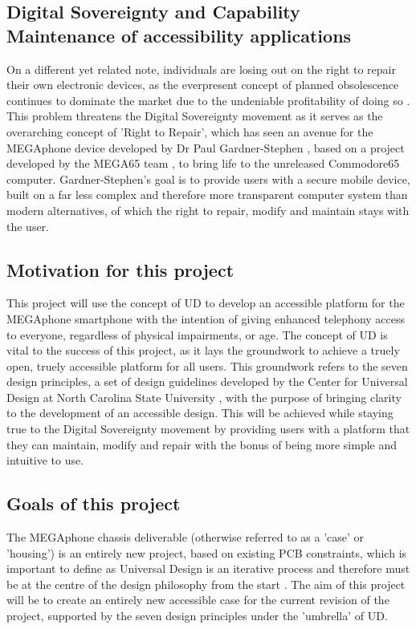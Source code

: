 \subsection{Digital Sovereignty and Capability Maintenance of accessibility applications} %
On a different yet related note, individuals are losing out on the right to repair their own electronic devices, as the everpresent concept of planned obsolescence continues to dominate the market due to the undeniable profitability of doing so \cite{obsolescence2}.
This problem threatens the Digital Sovereignty movement as it serves as the overarching concept of 'Right to Repair', which has seen an avenue for the MEGAphone device developed by Dr Paul Gardner-Stephen \cite{mobilehistory}, based on a project developed by the MEGA65 team \cite{mega65}, to bring life to the unreleased Commodore65 computer. %
Gardner-Stephen's goal is to provide users with a secure mobile device, built on a far less complex and therefore more transparent computer system than modern alternatives, of which the right to repair, modify and maintain stays with the user.

\subsection{Motivation for this project} %
This project will use the concept of UD to develop an accessible platform for the MEGAphone smartphone with the intention of giving enhanced telephony access to everyone, regardless of physical impairments, or age.
The concept of UD is vital to the success of this project, as it lays the groundwork to achieve a truely open, truely accessible platform for all users. 
This groundwork refers to the seven design principles, a set of design guidelines developed by the Center for Universal Design at North Carolina State University \cite{sevenprinciples}, with the purpose of bringing clarity to the development of an accessible design.
This will be achieved while staying true to the Digital Sovereignty movement by providing users with a platform that they can maintain, modify and repair with the bonus of being more simple and intuitive to use.

\subsection{Goals of this project}
The MEGAphone chassis deliverable (otherwise referred to as a 'case' or 'housing') is an entirely new project, based on existing PCB constraints, which is important to define as Universal Design is an iterative process and therefore must be at the centre of the design philosophy from the start \cite{incldesign}.
The aim of this project will be to create an entirely new accessible case for the current revision of the project, supported by the seven design principles under the 'umbrella' of UD.


